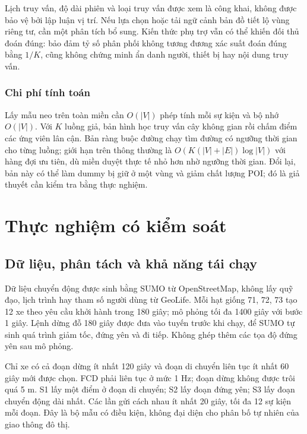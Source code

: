 Lịch truy vấn, độ dài phiên và loại truy vấn được xem là công khai, không được bảo vệ bởi lập luận vị trí. Nếu lựa chọn hoặc tải ngữ cảnh bản đồ tiết lộ vùng riêng tư, cần một phân tích bổ sung. Kiến thức phụ trợ vẫn có thể khiến đối thủ đoán đúng: bảo đảm tỷ số phân phối không tương đương xác suất đoán đúng bằng $1/K$, cũng không chứng minh ẩn danh người, thiết bị hay nội dung truy vấn.

\subsection{Chi phí tính toán}

Lấy mẫu neo trên toàn miền cần $O(|V|)$ phép tính mỗi sự kiện và bộ nhớ $O(|V|)$. Với $K$ luồng giả, bản hình học truy vấn cây không gian rồi chấm điểm các ứng viên lân cận. Bản ràng buộc đường chạy tìm đường có ngưỡng thời gian cho từng luồng; giới hạn trên thông thường là $O(K(|V|+|E|)\log |V|)$ với hàng đợi ưu tiên, dù miền duyệt thực tế nhỏ hơn nhờ ngưỡng thời gian. Đổi lại, bản này có thể làm dummy bị giữ ở một vùng và giảm chất lượng POI; đó là giả thuyết cần kiểm tra bằng thực nghiệm.

\chapter{Thực nghiệm có kiểm soát}
\label{ch:experiments}

\section{Dữ liệu, phân tách và khả năng tái chạy}

Dữ liệu chuyển động được sinh bằng SUMO từ OpenStreetMap, không lấy quỹ đạo, lịch trình hay tham số người dùng từ GeoLife. Mỗi hạt giống 71, 72, 73 tạo 12 xe theo yêu cầu khởi hành trong 180 giây; mô phỏng tối đa 1400 giây với bước 1 giây. Lệnh dừng đỗ 180 giây được đưa vào tuyến trước khi chạy, để SUMO tự sinh quá trình giảm tốc, đứng yên và đi tiếp. Không ghép thêm các tọa độ đứng yên sau mô phỏng.

Chỉ xe có cả đoạn dừng ít nhất 120 giây và đoạn di chuyển liên tục ít nhất 60 giây mới được chọn. FCD phải liên tục ở mức 1 Hz; đoạn dừng không được trôi quá 5 m. S1 lấy một điểm ở đoạn di chuyển; S2 lấy đoạn đứng yên; S3 lấy đoạn chuyển động dài nhất. Các lần gửi cách nhau ít nhất 20 giây, tối đa 12 sự kiện mỗi đoạn. Đây là bộ mẫu có điều kiện, không đại diện cho phân bố tự nhiên của giao thông đô thị.

